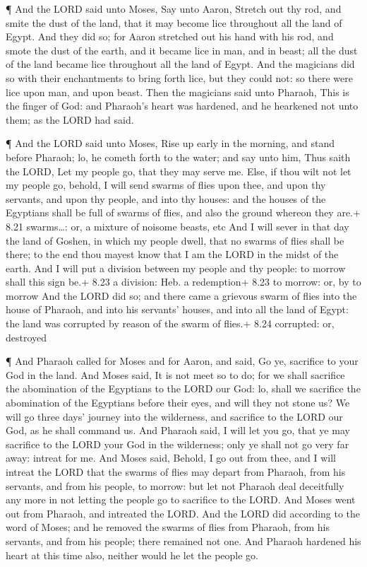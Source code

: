  ¶ And the LORD said unto Moses, Say unto Aaron, Stretch
out thy rod, and smite the dust of the land, that it may become lice
throughout all the land of Egypt.  And they did so; for
Aaron stretched out his hand with his rod, and smote the dust of the
earth, and it became lice in man, and in beast; all the dust of the land
became lice throughout all the land of Egypt.  And the
magicians did so with their enchantments to bring forth lice, but they
could not: so there were lice upon man, and upon beast. 
Then the magicians said unto Pharaoh, This is the finger of God: and
Pharaoh's heart was hardened, and he hearkened not unto them; as the
LORD had said.

 ¶ And the LORD said unto Moses, Rise up early in the
morning, and stand before Pharaoh; lo, he cometh forth to the water; and
say unto him, Thus saith the LORD, Let my people go, that they may serve
me.  Else, if thou wilt not let my people go, behold, I
will send swarms of flies upon thee, and upon thy servants, and upon thy
people, and into thy houses: and the houses of the Egyptians shall be
full of swarms of flies, and also the ground whereon they are.+ 8.21
swarms\ldots: or, a mixture of noisome beasts, etc  And I
will sever in that day the land of Goshen, in which my people dwell,
that no swarms of flies shall be there; to the end thou mayest know that
I am the LORD in the midst of the earth.  And I will put a
division between my people and thy people: to morrow shall this sign
be.+ 8.23 a division: Heb. a redemption+ 8.23 to morrow: or, by to
morrow  And the LORD did so; and there came a grievous
swarm of flies into the house of Pharaoh, and into his servants' houses,
and into all the land of Egypt: the land was corrupted by reason of the
swarm of flies.+ 8.24 corrupted: or, destroyed

 ¶ And Pharaoh called for Moses and for Aaron, and said, Go
ye, sacrifice to your God in the land.  And Moses said, It
is not meet so to do; for we shall sacrifice the abomination of the
Egyptians to the LORD our God: lo, shall we sacrifice the abomination of
the Egyptians before their eyes, and will they not stone us?
 We will go three days' journey into the wilderness, and
sacrifice to the LORD our God, as he shall command us.  And
Pharaoh said, I will let you go, that ye may sacrifice to the LORD your
God in the wilderness; only ye shall not go very far away: intreat for
me.  And Moses said, Behold, I go out from thee, and I will
intreat the LORD that the swarms of flies may depart from Pharaoh, from
his servants, and from his people, to morrow: but let not Pharaoh deal
deceitfully any more in not letting the people go to sacrifice to the
LORD.  And Moses went out from Pharaoh, and intreated the
LORD.  And the LORD did according to the word of Moses; and
he removed the swarms of flies from Pharaoh, from his servants, and from
his people; there remained not one.  And Pharaoh hardened
his heart at this time also, neither would he let the people go.

